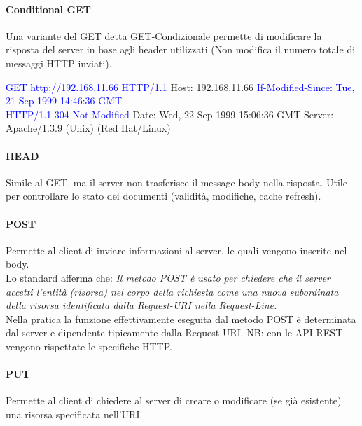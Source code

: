 \paragraph{Conditional GET} Una variante del GET detta GET-Condizionale permette di modificare la risposta del server in base agli header utilizzati (Non modifica il numero totale di messaggi HTTP inviati).
\newpage
\begin{mdframed}
    \textcolor{blue}{GET http://192.168.11.66 HTTP/1.1}\newline
    Host: 192.168.11.66\newline
    \textcolor{blue}{If-Modified-Since: Tue, 21 Sep 1999 14:46:36 GMT}\newline
    \\
    \textcolor{blue}{HTTP/1.1 304 Not Modified}\newline
    Date: Wed, 22 Sep 1999 15:06:36 GMT\newline
    Server: Apache/1.3.9 (Unix) (Red Hat/Linux)\newline
\end{mdframed}

\paragraph{HEAD}
Simile al GET, ma il server non trasferisce il message body nella risposta.
Utile per controllare lo stato dei documenti (validità, modifiche, cache refresh).

\paragraph{POST} Permette al client di inviare informazioni al server, le quali vengono inserite nel body.\newline
\\
Lo standard afferma che:\newline
\emph{Il metodo POST è usato per chiedere che il server accetti l’entità (risorsa)
nel corpo della richiesta come una nuova subordinata della risorsa
identificata dalla Request-URI nella Request-Line.}
\\
\newline
Nella pratica la funzione effettivamente eseguita dal metodo POST è determinata dal server e dipendente tipicamente dalla Request-URI.
\newline
NB: con le API REST vengono rispettate le specifiche HTTP.

\paragraph{PUT} Permette al client di chiedere al server di creare o modificare (se già esistente) una risorsa specificata nell'URI.

